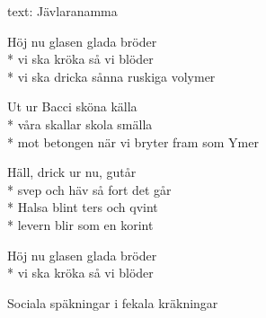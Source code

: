 \begin{SongText}
    \begin{SongInfo}
        text: Jävlaranamma
    \end{SongInfo}
    \begin{SongVerse}
        Höj nu glasen glada bröder\\*%
        vi ska kröka så vi blöder\\*%
        vi ska dricka sånna ruskiga volymer
    \end{SongVerse}
    \begin{SongVerse}
        Ut ur Bacci sköna källa\\*%
        våra skallar skola smälla\\*%
        mot betongen när vi bryter fram som Ymer
    \end{SongVerse}
    \begin{SongVerse}
        Häll, drick ur nu, gutår\\*%
        svep och häv så fort det går\\*%
        Halsa blint ters och qvint\\*%
        levern blir som en korint
    \end{SongVerse}
    \begin{SongVerse}
        Höj nu glasen glada bröder\\*%
        vi ska kröka så vi blöder
    \end{SongVerse}
    \begin{SongVerse}
        Sociala späkningar i fekala kräkningar
   
    \end{SongVerse}
\end{SongText}
